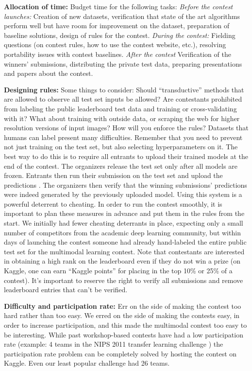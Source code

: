 \documentclass{llncs}
\begin{document}
{\bf Allocation of time:} Budget time for the following tasks: {\em Before the contest launches:} 
Creation of new datasets, verification that state of the art algorithms perform well but have room
for improvement on the dataset, preparation of baseline solutions, design of rules for the contest.
{\em During the contest: } Fielding questions (on contest rules, how to use the contest website, etc.),
resolving portability issues with contest baselines. {\em After the contest} Verification of the winners'
submissions, distributing the private test data, preparing presentations and papers about the contest.

{\bf Designing rules:} Some things to consider:
Should ``transductive'' methods that are allowed to observe all test set inputs be allowed? Are contestants prohibited from
labeling the public leaderboard test data and training or cross-validating with it? What about training with outside data, or scraping the web for higher resolution versions of input images? How will you enforce the rules?
Datasets that humans can label present many difficulties. Remember that you need to prevent not just training on the test set, but also selecting hyperparameters on it.
The best way to do this is to require all entrants to upload their trained models at the end of the contest. The organizers
release the test set only after all models are frozen. Entrants then run their submission on the test set and upload the predictions
. The organizers then verify that the winning submissions' predictions were indeed generated by the previously uploaded model.
Using this system is a powerful deterrent to cheating. In order to run the contest smoothly, it is important to plan these
measures in advance and put them in the rules from the start. We initially had fewer cheating deterrants in place, expecting
only a small number of competitors from the academic deep learning community, but within days of launching the contest someone
had already hand-labeled the entire public test set for the multimodal learning contest. Note that contestants are interested in obtaining a high
rank on the leaderboard even if they do not win a prize (on Kaggle, one can earn ``Kaggle points'' for placing in the top 10\% or 25\% of a contest).
It's important to reserve the right to verify all submissions and remove leaderboard entries that can't be verified.

{\bf Difficulty and participation rate:} Err on the side of making the contest too hard rather than too easy.
We erred on the side of making the contests easy, in order to increase participation, and this made the multimodal contest
too easy to be interesting. While past workshop-based contests have had a low participation rate (example: 4
teams in the NIPS 2011 transfer learning challenge \citep{NipsWorkshop11Hierarchical,Goodfellow+al-ICML2012})
the participation rate problem can be completely solved by hosting the contest on Kaggle. Even our least popular
challenge had 26 teams.
\end{document}
